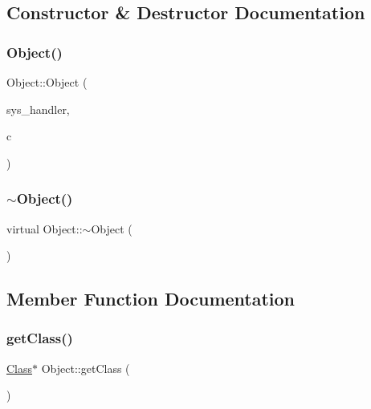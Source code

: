 \subsection{Constructor \& Destructor Documentation}
\mbox{\label{classObject_a208aa5ccaeae34404f1ebacdfec66fbb}} 
\subsubsection{\texorpdfstring{Object()}{Object()}}
{\footnotesize\ttfamily Object\+::\+Object (\begin{DoxyParamCaption}\item[{\hyperlink{classSystemHandler}{System\+Handler} $\ast$}]{sys\+\_\+handler,  }\item[{\hyperlink{classClass}{Class} $\ast$}]{c }\end{DoxyParamCaption})}

\mbox{\label{classObject_aa3e791419d84c4c346ef9499513b8e00}} 
\subsubsection{\texorpdfstring{$\sim$\+Object()}{~Object()}}
{\footnotesize\ttfamily virtual Object\+::$\sim$\+Object (\begin{DoxyParamCaption}{ }\end{DoxyParamCaption})\hspace{0.3cm}{\ttfamily [virtual]}}



\subsection{Member Function Documentation}
\mbox{\label{classObject_a51f229ad629a4ac1ad6e359a3b53941d}} 
\subsubsection{\texorpdfstring{get\+Class()}{getClass()}}
{\footnotesize\ttfamily \hyperlink{classClass}{Class}$\ast$ Object\+::get\+Class (\begin{DoxyParamCaption}{ }\end{DoxyParamCaption})}

